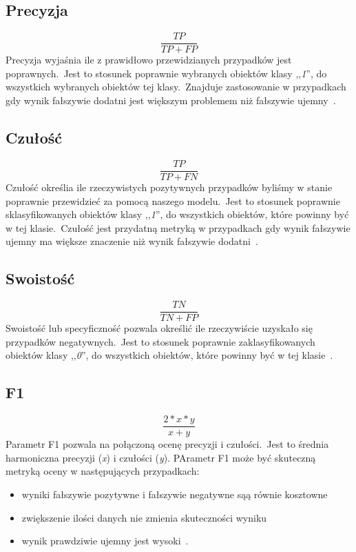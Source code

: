 \subsection{Precyzja}
\begin{equation}\label{math:prec}
    \frac{TP}{TP + FP}
\end{equation}
Precyzja wyjaśnia ile z prawidłowo przewidzianych przypadków jest poprawnych.\ Jest to stosunek poprawnie wybranych obiektów klasy ,,\textit{1}'', do wszystkich wybranych obiektów tej klasy.\ Znajduje zastosowanie w przypadkach gdy wynik fałszywie dodatni jest większym problemem niż fałszywie ujemny~\cite{Agrawal2024, Blyszcz2022, Kulkarni2020}.

\subsection{Czułość}
\begin{equation}\label{math:rec}
    \frac{TP}{TP + FN}
\end{equation}
Czułość określia ile rzeczywistych pozytywnych przypadków byliśmy w stanie poprawnie przewidzieć za pomocą naszego modelu.\ Jest to stosunek poprawnie sklasyfikowanych obiektów klasy ,,\textit{1}'', do wszystkich obiektów, które powinny być w tej klasie.\ Czułość jest przydatną metryką w przypadkach gdy wynik fałszywie ujemny ma większe znaczenie niż wynik fałszywie dodatni~\cite{Agrawal2024, Blyszcz2022, Kulkarni2020}.

\subsection{Swoistość}
\begin{equation}\label{math:swo}
    \frac{TN}{TN + FP}
\end{equation}
Swoistość lub specyficzność pozwala określić ile rzeczywiście uzyskało się przypadków negatywnych.\ Jest to stosunek poprawnie zaklasyfikowanych obiektów klasy ,,\textit{0}'', do wszystkich obiektów, które powinny być w tej klasie~\cite{Agrawal2024}.

\subsection{F1}
\begin{equation}\label{math:f1}
   \frac{2*x*y}{x + y}
\end{equation}
Parametr F1 pozwala na połączoną ocenę precyzji i czułości.\ Jest to średnia harmoniczna precyzji (\textit{x}) i czułości (\textit{y}). PArametr F1 może być skuteczną metryką oceny w następujących przypadkach:
\begin{itemize}
    \item wyniki fałszywie pozytywne i fałszywie negatywne sąą równie kosztowne
    \item zwiększenie ilości danych nie zmienia skuteczności wyniku
    \item wynik prawdziwie ujemny jest wysoki~\cite{Agrawal2024}.
\end{itemize}

